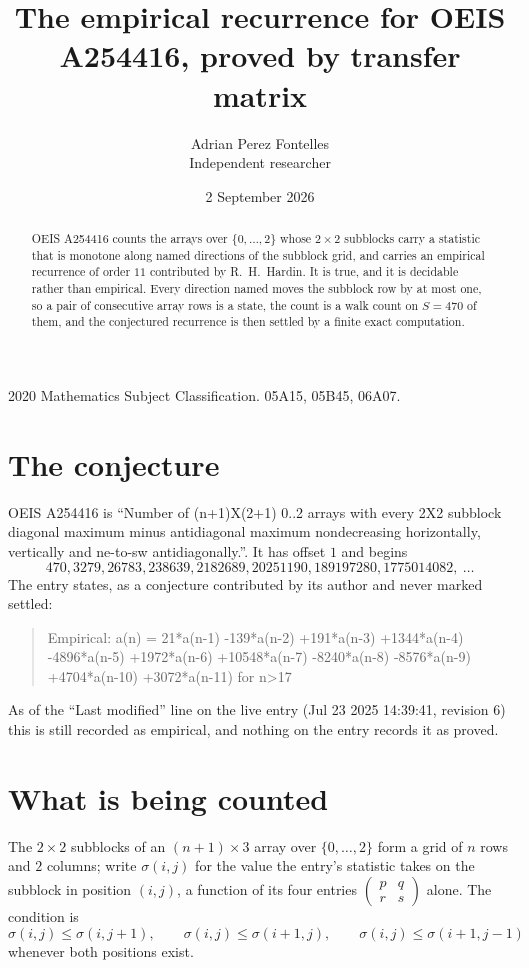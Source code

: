\documentclass[11pt,a4paper]{article}
\title{The empirical recurrence for OEIS A254416, proved by transfer matrix}
\author{Adrian Perez Fontelles\\ \small Independent researcher}
\date{2 September 2026}
\theoremstyle{plain}
\theoremstyle{definition}
\begin{document}
\maketitle

\begin{abstract}
OEIS A254416 counts the arrays over $\{0,\dots,2\}$ whose $2\times2$ subblocks carry a
statistic that is monotone along named directions of the subblock grid, and carries an
empirical recurrence of order $11$ contributed by R.~H.~Hardin. It is true, and it is
decidable rather than empirical. Every direction named moves the subblock row by at most one,
so a pair of consecutive array rows is a state, the count is a walk count on $S=470$ of them,
and the conjectured recurrence is then settled by a finite exact computation.
\end{abstract}

\noindent\small 2020 Mathematics Subject Classification. 05A15, 05B45, 06A07.\normalsize

\section{The conjecture}

OEIS A254416 is ``Number of (n+1)X(2+1) 0..2 arrays with every 2X2 subblock diagonal maximum minus antidiagonal maximum nondecreasing horizontally, vertically and ne-to-sw antidiagonally.''. It has offset $1$ and begins
\[
470, 3279, 26783, 238639, 2182689, 20251190, 189197280, 1775014082,\ \dots
\]
The entry states, as a conjecture contributed by its author and never marked settled:
\begin{quote}
Empirical: a(n) = 21*a(n-1) -139*a(n-2) +191*a(n-3) +1344*a(n-4) -4896*a(n-5) +1972*a(n-6) +10548*a(n-7) -8240*a(n-8) -8576*a(n-9) +4704*a(n-10) +3072*a(n-11) for n>17
\end{quote}
As of the ``Last modified'' line on the live entry (Jul 23 2025 14:39:41, revision 6) this is still
recorded as empirical, and nothing on the entry records it as proved.

\section{What is being counted}

The $2\times2$ subblocks of an $(n+1)\times3$ array over $\{0,\dots,2\}$ form a grid
of $n$ rows and $2$ columns; write $\sigma(i,j)$ for the value the entry's statistic takes on
the subblock in position $(i,j)$, a function of its four entries
$\begin{pmatrix}p&q\\r&s\end{pmatrix}$ alone. The condition is
\[
\sigma(i,j)\le\sigma(i,j+1),\qquad \sigma(i,j)\le\sigma(i+1,j),\qquad \sigma(i,j)\le\sigma(i+1,j-1)
\]
whenever both positions exist.
\end{document}
